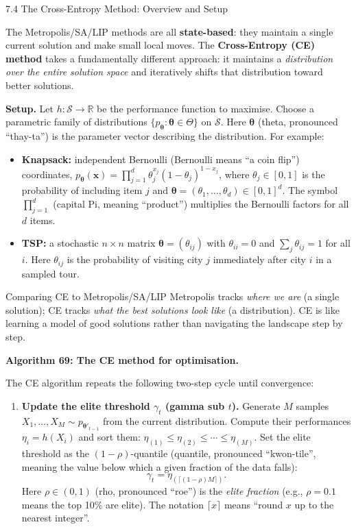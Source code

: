 \documentclass[aspectratio=169,10pt]{beamer}
\newcommand{\R}{\mathbb{R}}
\newcommand{\bx}{\mathbf{x}}
\newcommand{\btheta}{\boldsymbol{\theta}}
\newcommand{\calS}{\mathcal{S}}
\begin{document}
\begin{frame}[allowframebreaks]{7.4 The Cross-Entropy Method: Overview and Setup}

The Metropolis/SA/LIP methods are all \textbf{state-based}: they maintain a
single current solution and make small local moves.  The
\textbf{Cross-Entropy (CE) method} takes a fundamentally different approach:
it maintains a \emph{distribution over the entire solution space} and
iteratively shifts that distribution toward better solutions.

\medskip
\textbf{Setup.}
Let $h : \calS \to \R$ be the performance function to maximise.  Choose a
parametric family of distributions $\{p_{\btheta} : \btheta \in \Theta\}$
on $\calS$.  Here $\btheta$ (theta, pronounced ``thay-ta'') is the parameter
vector describing the distribution.  For example:
\begin{itemize}
  \item \textbf{Knapsack:} independent Bernoulli (Bernoulli means ``a
    coin flip'') coordinates,
    $p_{\btheta}(\bx) = \prod_{j=1}^d \theta_j^{x_j}(1-\theta_j)^{1-x_j}$,
    where $\theta_j \in [0,1]$ is the probability of including item $j$
    and $\btheta = (\theta_1,\ldots,\theta_d) \in [0,1]^d$.  The symbol
    $\prod_{j=1}^d$ (capital Pi, meaning ``product'') multiplies the
    Bernoulli factors for all $d$ items.
  \item \textbf{TSP:} a stochastic $n \times n$ matrix
    $\btheta = (\theta_{ij})$ with $\theta_{ii}=0$ and
    $\sum_j \theta_{ij} = 1$ for all $i$.  Here $\theta_{ij}$ is the
    probability of visiting city $j$ immediately after city $i$ in a
    sampled tour.
\end{itemize}

\begin{alertblock}{Comparing CE to Metropolis/SA/LIP}
  Metropolis tracks \emph{where we are} (a single solution); CE tracks
  \emph{what the best solutions look like} (a distribution).  CE is like
  learning a model of good solutions rather than navigating the landscape
  step by step.
\end{alertblock}

\framebreak

\textbf{Algorithm 69: The CE method for optimisation.}

The CE algorithm repeats the following two-step cycle until convergence:

\begin{enumerate}
  \item \textbf{Update the elite threshold $\gamma_t$ (gamma sub $t$).}
    Generate $M$ samples $X_1,\ldots,X_M \sim p_{\btheta'_{t-1}}$ from the
    current distribution.  Compute their performances $\eta_i = h(X_i)$ and
    sort them: $\eta_{(1)} \le \eta_{(2)} \le \cdots \le \eta_{(M)}$.  Set
    the elite threshold as the $(1-\rho)$-quantile (quantile, pronounced
    ``kwon-tile'', meaning the value below which a given fraction of the data
    falls):
    \[
      \gamma_t = \eta_{(\lceil(1-\rho)M\rceil)}.
    \]
    Here $\rho \in (0,1)$ (rho, pronounced ``roe'') is the \emph{elite
    fraction} (e.g., $\rho=0.1$ means the top 10\% are elite).  The notation
    $\lceil x \rceil$ means ``round $x$ up to the nearest integer''.


\end{enumerate}
\end{frame}
\end{document}
